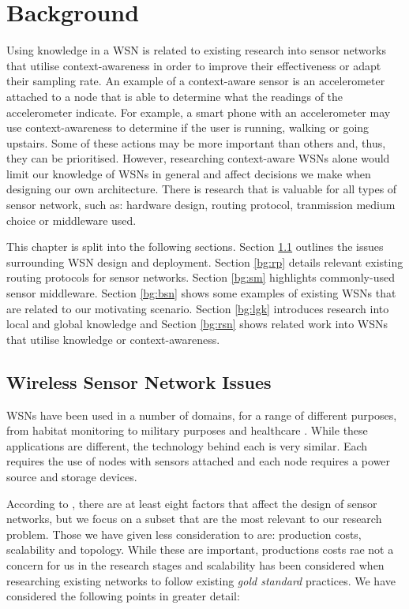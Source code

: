 \chapter{Background}\label{chap:bg}
Using knowledge in a WSN is related to existing research into sensor networks that utilise context-awareness in order to improve their effectiveness or adapt their sampling rate. An example of a context-aware sensor is an accelerometer attached to a node that is able to determine what the readings of the accelerometer indicate. For example, a smart phone with an accelerometer may use context-awareness to determine if the user is running, walking or going upstairs. Some of these actions may be more important than others and, thus, they can be prioritised. However, researching context-aware WSNs alone would limit our knowledge of WSNs in general and affect decisions we make when designing our own architecture. There is research that is valuable for all types of sensor network, such as: hardware design, routing protocol, tranmission medium choice or middleware used.

This chapter is split into the following sections. Section \ref{bg:wsni} outlines the issues surrounding WSN design and deployment. 
Section \ref{bg:rp} details relevant existing routing protocols for sensor networks. Section \ref{bg:sm} highlights commonly-used sensor middleware. Section \ref{bg:bsn} shows some examples of existing WSNs that are related to our motivating scenario. Section \ref{bg:lgk} introduces research into local and global knowledge and Section \ref{bg:rsn} shows related work into WSNs that utilise knowledge or context-awareness.

\section{Wireless Sensor Network Issues} \label{bg:wsni}

WSNs have been used in a number of domains, for a range of different purposes, from habitat monitoring \cite{Szewczyk2004a} to military purposes \cite{Pizzocaro} and healthcare \cite{Otto2006}. While these applications are different, the technology behind each is very similar. Each requires the use of nodes with sensors attached and each node requires a power source and storage devices.

According to \cite{Akyildiz2002}, there are at least eight factors that affect the design of sensor networks, but we focus on a subset that are the most relevant to our research problem. Those we have given less consideration to are: production costs, scalability and topology. While these are important, productions costs rae not a concern for us in the research stages and scalability has been considered when researching existing networks to follow existing \textit{gold standard} practices. We have considered the following points in greater detail:

